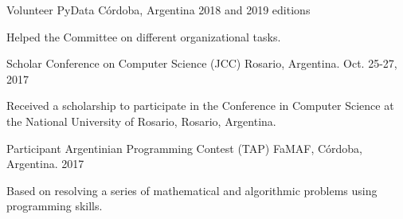 \documentclass[10pt, a4paper]{resume}
\begin{document}
\begin{cventries}
\end{cventries}



\begin{cventries}

  \cventry
    {Volunteer}
    {PyData}
    {Córdoba, Argentina}
    {2018 and 2019 editions}
    {
      \begin{cvitems}
		\item {Helped the Committee on different organizational tasks.}
      \end{cvitems}
    }

  \cventry
    {Scholar}
    {Conference on Computer Science (JCC)}
    {Rosario, Argentina.}
    {Oct. 25-27, 2017}
    {
      \begin{cvitems}
        \item {Received a scholarship to participate in the Conference in Computer Science at the National University of Rosario, Rosario, Argentina.}
      \end{cvitems}
    }

  \cventry
    {Participant}
    {Argentinian Programming Contest (TAP)}
    {FaMAF, Córdoba, Argentina.}
    {2017}
    {
      \begin{cvitems}
        \item {Based on resolving a series of mathematical and algorithmic problems using programming skills.}
      \end{cvitems}
    }

\end{cventries}


\end{document}
